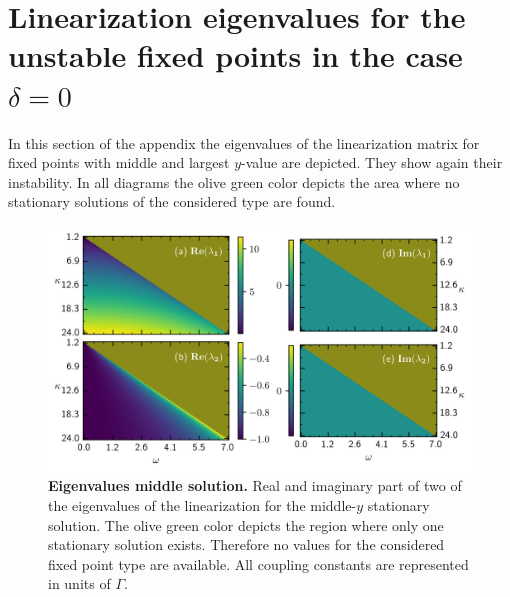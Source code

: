     \section{Linearization eigenvalues for the unstable fixed points in the case $\delta=0$}
    \label{appendix:eig_del0}
    In this section of the appendix the eigenvalues of the linearization matrix for fixed points with middle and largest $y$-value are depicted. They show again their instability. In all diagrams the olive green color depicts the area where no stationary solutions of the considered type are found.
    \begin{figure}[H]
        \centering
        \includegraphics{pictures/lam_anal_m1.png}
        \caption{\textbf{Eigenvalues middle solution.} Real and imaginary part of two of the eigenvalues of the linearization for the middle-$y$ stationary solution. The olive green color depicts the region where only one stationary solution exists. Therefore no values for the considered fixed point type are available. All coupling constants are represented in units of $\Gamma$.
        }
    \end{figure}
    
